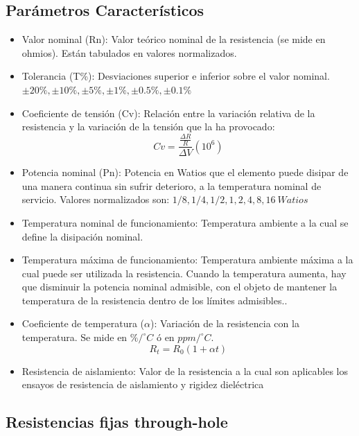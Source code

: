 \subsection{Parámetros Característicos}

\begin{itemize}
    \item Valor nominal (Rn): Valor teórico nominal de la resistencia (se mide en ohmios). Están tabulados en valores normalizados.
    \item Tolerancia (T\%): Desviaciones superior e inferior sobre el valor nominal. $\pm 20\%,\pm 10\%,\pm 5\%,\pm 1\%,\pm 0.5\%,\pm 0.1\% $
    \item Coeficiente de tensión (Cv): Relación entre la variación relativa de la resistencia y la variación de la tensión que la ha provocado:
    \begin{equation}
        Cv = \frac{\frac{\Delta R}{R}}{\Delta V} (10^6)
    \end{equation}
    \item Potencia nominal (Pn): Potencia en Watios que el elemento puede disipar de una manera continua sin sufrir deterioro, a la temperatura nominal de servicio. Valores normalizados son: $1/8, 1/4, 1/2, 1, 2, 4, 8, 16\ Watios$
    \item Temperatura nominal de funcionamiento: Temperatura ambiente a la cual se define la disipación nominal.
    \item Temperatura máxima de funcionamiento: Temperatura ambiente máxima a la cual puede ser utilizada la resistencia. Cuando la temperatura aumenta, hay que disminuir la potencia nominal admisible, con el objeto de mantener la temperatura de la resistencia dentro de los límites admisibles..
    \item Coeficiente de temperatura ($\alpha$): Variación de la resistencia con la temperatura. Se mide en $\% / ^\circ C$ ó en $ppm / ^\circ C$.
    \begin{equation}
        R_t = R_0 (1 + \alpha t)
    \end{equation}
    \item Resistencia de aislamiento: Valor de la resistencia a la cual son aplicables los ensayos de resistencia de aislamiento y rigidez dieléctrica
\end{itemize}

\subsection{Resistencias fijas through-hole}
